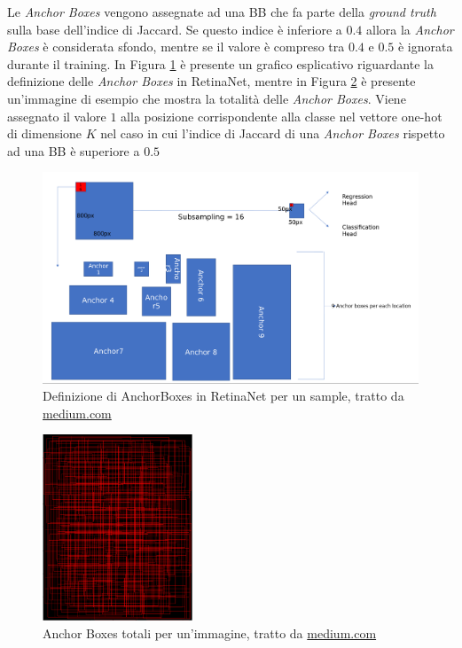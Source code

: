 Le \textit{Anchor Boxes} vengono assegnate ad una \ac{BB} che fa parte della \textit{ground truth} sulla base dell'indice di Jaccard. Se questo indice è inferiore a $0.4$ allora la \textit{Anchor Boxes} è considerata sfondo, mentre se il valore è compreso tra $0.4$ e $0.5$ è ignorata durante il training. In Figura \ref{fig:anchor_retinanet} è presente un grafico esplicativo riguardante la definizione delle \textit{Anchor Boxes} in RetinaNet, mentre in Figura \ref{fig:anchor_retinanet2} è presente un'immagine di esempio che mostra la totalità delle \textit{Anchor Boxes}. 
Viene assegnato il valore $1$ alla posizione corrispondente alla classe nel vettore one-hot di dimensione $K$ nel caso in cui l'indice di Jaccard di una \textit{Anchor Boxes} rispetto ad una \ac{BB} è superiore a $0.5$
\begin{figure}[]
    \centering
    \includegraphics[width=\textwidth]{images/examples/ab_retinanet1.png}
    \caption{Definizione di AnchorBoxes in RetinaNet per un sample, tratto da \href{https://medium.com/@14prakash/the-intuition-behind-retinanet-eb636755607d}{medium.com}}
    \label{fig:anchor_retinanet}
\end{figure}
\begin{figure}[]
    \centering
    \includegraphics[width=0.4\textwidth]{images/examples/ab_retinanet2.png}
    \caption{Anchor Boxes totali per un'immagine, tratto da \href{https://medium.com/@14prakash/the-intuition-behind-retinanet-eb636755607d}{medium.com}}
    \label{fig:anchor_retinanet2}
\end{figure}

